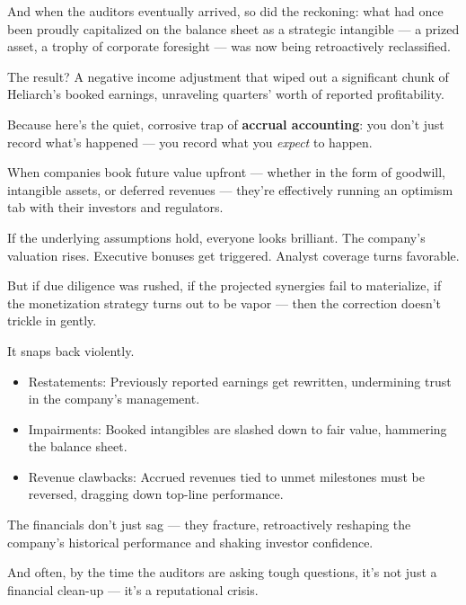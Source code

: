 \medskip

And when the auditors eventually arrived, so did the reckoning:
what had once been proudly capitalized on the balance sheet as a strategic intangible — a prized asset, a trophy of corporate foresight — was now being retroactively reclassified.

The result?
A negative income adjustment that wiped out a significant chunk of Heliarch’s booked earnings, unraveling quarters’ worth of reported profitability.

Because here’s the quiet, corrosive trap of \textbf{accrual accounting}:
you don’t just record what’s happened — you record what you \textit{expect} to happen.

When companies book future value upfront — whether in the form of goodwill, intangible assets, or deferred revenues — they’re effectively running an optimism tab with their investors and regulators.

If the underlying assumptions hold, everyone looks brilliant.
The company’s valuation rises. Executive bonuses get triggered. Analyst coverage turns favorable.

But if due diligence was rushed, if the projected synergies fail to materialize, if the monetization strategy turns out to be vapor —
then the correction doesn’t trickle in gently.

It snaps back violently.
\begin{itemize}
\item Restatements: Previously reported earnings get rewritten, undermining trust in the company’s management.
\item Impairments: Booked intangibles are slashed down to fair value, hammering the balance sheet.
\item Revenue clawbacks: Accrued revenues tied to unmet milestones must be reversed, dragging down top-line performance.
\end{itemize}

\medskip

The financials don’t just sag — they fracture, retroactively reshaping the company’s historical performance and shaking investor confidence.

And often, by the time the auditors are asking tough questions, it’s not just a financial clean-up —
it’s a reputational crisis.

\medskip

